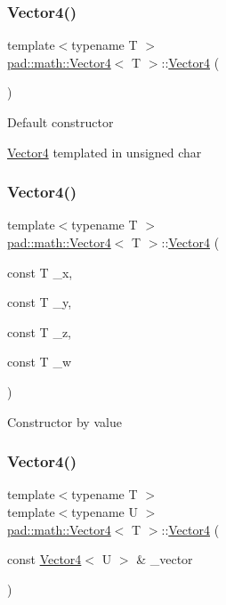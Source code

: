 \subsubsection{\texorpdfstring{Vector4()}{Vector4()}\hspace{0.1cm}{\footnotesize\ttfamily [1/7]}}
{\footnotesize\ttfamily template$<$typename T $>$ \\
\mbox{\hyperlink{structpad_1_1math_1_1_vector4}{pad\+::math\+::\+Vector4}}$<$ T $>$\+::\mbox{\hyperlink{structpad_1_1math_1_1_vector4}{Vector4}} (\begin{DoxyParamCaption}{ }\end{DoxyParamCaption})}

Default constructor

\mbox{\hyperlink{structpad_1_1math_1_1_vector4}{Vector4}} templated in unsigned char \mbox{\label{structpad_1_1math_1_1_vector4_a9ba6589a62f7635c2255c52c7b818aec}} 
\subsubsection{\texorpdfstring{Vector4()}{Vector4()}\hspace{0.1cm}{\footnotesize\ttfamily [2/7]}}
{\footnotesize\ttfamily template$<$typename T $>$ \\
\mbox{\hyperlink{structpad_1_1math_1_1_vector4}{pad\+::math\+::\+Vector4}}$<$ T $>$\+::\mbox{\hyperlink{structpad_1_1math_1_1_vector4}{Vector4}} (\begin{DoxyParamCaption}\item[{const T}]{\+\_\+x,  }\item[{const T}]{\+\_\+y,  }\item[{const T}]{\+\_\+z,  }\item[{const T}]{\+\_\+w }\end{DoxyParamCaption})}

Constructor by value \mbox{\label{structpad_1_1math_1_1_vector4_a75987918337a3705cae46e39f4362433}} 
\subsubsection{\texorpdfstring{Vector4()}{Vector4()}\hspace{0.1cm}{\footnotesize\ttfamily [3/7]}}
{\footnotesize\ttfamily template$<$typename T $>$ \\
template$<$typename U $>$ \\
\mbox{\hyperlink{structpad_1_1math_1_1_vector4}{pad\+::math\+::\+Vector4}}$<$ T $>$\+::\mbox{\hyperlink{structpad_1_1math_1_1_vector4}{Vector4}} (\begin{DoxyParamCaption}\item[{const \mbox{\hyperlink{structpad_1_1math_1_1_vector4}{Vector4}}$<$ U $>$ \&}]{\+\_\+vector }\end{DoxyParamCaption})}

